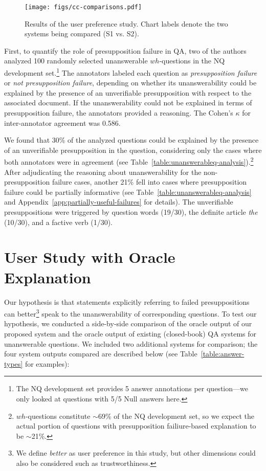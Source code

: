 \documentclass[11pt,a4paper]{article}
\begin{document}
\begin{figure*}[t]
    \centering
    \texttt{[image: figs/cc-comparisons.pdf]}
    \caption{Results of the user preference study. Chart labels denote the two systems being compared (S1 vs. S2).
    }
    \label{fig:sxs-results}
\end{figure*}

First, to quantify the role of presupposition failure in QA, two of the authors analyzed 100 randomly selected unanswerable $wh$-questions in the NQ development set.\footnote{The NQ development set provides 5 answer annotations per question---we only looked at questions with 5/5 Null answers here.} The annotators labeled each question as \textit{presupposition failure} or \textit{not presupposition failure}, depending on whether its unanswerability could be explained by the presence of an unverifiable presupposition with respect to the associated document. If the unanswerability could not be explained in terms of presupposition failure, the annotators provided a reasoning. The Cohen's $\kappa$ for inter-annotator agreement was 0.586.

We found that 30\% of the analyzed questions could be explained by the presence of an unverifiable presupposition in the question, considering only the cases where both annotators were in agreement (see Table~\ref{table:unanswerableq-analysis}).\footnote{$wh$-questions constitute $\sim$69\% of the NQ development set, so we expect the actual portion of questions with presupposition failiure-based explanation to be $\sim$21\%.} After adjudicating the reasoning about unanswerability for the non-presupposition failure cases, another 21\% fell into cases where presupposition failure could be partially informative (see Table~\ref{table:unanswerableq-analysis} and Appendix~\ref{app:partially-useful-failures} for details). The unverifiable presuppositions were triggered by question words (19/30), the definite article \textit{the} (10/30), and a factive verb (1/30). 

\section{User Study with Oracle Explanation}
\label{sec:user-study}

Our hypothesis is that statements explicitly referring to failed presuppositions can better\footnote{We define \textit{better} as user preference in this study, but other dimensions could also be considered such as trustworthiness.} speak to the unanswerability of corresponding questions. To test our hypothesis, we conducted a side-by-side comparison of the oracle output of our proposed system and the oracle output of existing (closed-book) QA systems for unanswerable questions. We included two additional systems for comparison; the four system outputs compared are described below (see Table~\ref{table:answer-types} for examples): 
\end{document}
